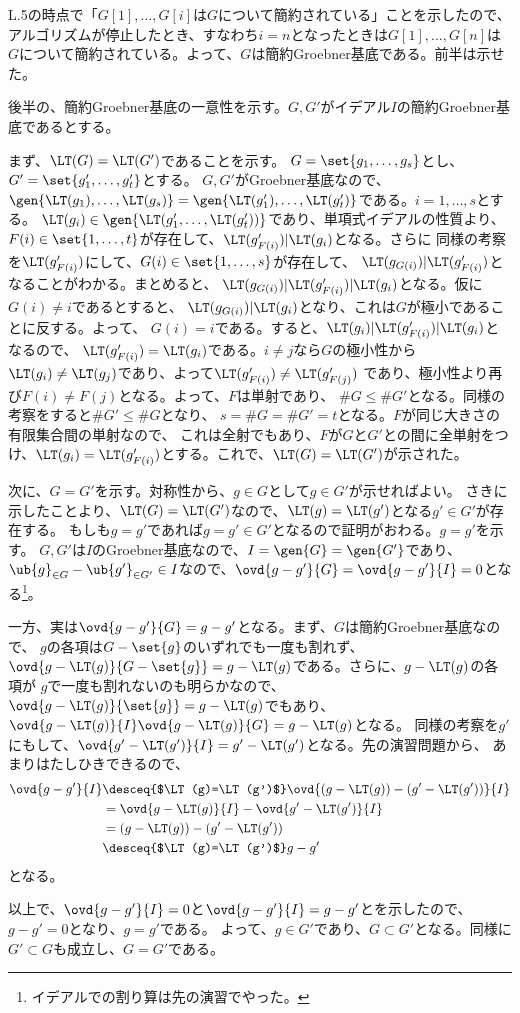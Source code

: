 \begin{myproof}
L.5の時点で「$G[1],\dots,G[i]$は$G$について簡約されている」ことを示したので、
アルゴリズムが停止したとき、すなわち$i=n$となったときは$G[1],\dots,G[n]$は$G$について簡約されている。よって、$G$は簡約Groebner基底である。前半は示せた。

後半の、簡約Groebner基底の一意性を示す。$G,G'$がイデアル$I$の簡約Groebner基底であるとする。

まず、$\LT(G) = \LT(G')$であることを示す。
$G=\set{g_1,\dots,g_s}$とし、$G'=\set{g_1',\dots,g_t'}$とする。
$G,G'$がGroebner基底なので、$\gen{\LT(g_1),\dots,\LT(g_s)} = \gen{\LT(g_1'),\dots,\LT(g_t')}$である。$i=1,\dots,s$とする。
$\LT(g_i) \in \gen{\LT(g_1',\dots,\LT(g_t'))}$であり、単項式イデアルの性質より、
$F(i) \in \set{1,\dots,t}$が存在して、$\LT(g_{F(i)}')|\LT(g_i)$となる。さらに
同様の考察を$\LT(g'_{F(i)})$にして、$G(i)\in \set{1,\dots,s}$が存在して、
$\LT(g_{G(i)})|\LT(g_{F(i)}')$となることがわかる。まとめると、
$\LT(g_{G(i)})|\LT(g_{F(i)}')|\LT(g_{i})$となる。仮に$G(i)\neq i$であるとすると、
$\LT(g_{G(i)})|\LT(g_i)$となり、これは$G$が極小であることに反する。よって、
$G(i)=i$である。すると、$\LT(g_i)|\LT(g'_{F(i)})|\LT(g_i)$となるので、
$\LT(g'_{F(i)})  = \LT(g_i)$である。$i\neq j$なら$G$の極小性から
$\LT(g_i) \neq \LT( g_j)$であり、よって$\LT(g'_{F(i)})\neq \LT(g'_{F(j)})$
であり、極小性より再び$F(i) \neq F(j)$となる。よって、$F$は単射であり、
$\# G \le \# G'$となる。同様の考察をすると$\# G' \le \# G$となり、
$s = \# G = \# G' = t$となる。$F$が同じ大きさの有限集合間の単射なので、
これは全射でもあり、$F$が$G$と$G'$との間に全単射をつけ、$\LT(g_i) = \LT(g'_{F(i)})$とする。これで、$\LT(G) = \LT(G')$が示された。

次に、$G=G'$を示す。対称性から、$g\in G$として$g\in G'$が示せればよい。
さきに示したことより、$\LT(G) = \LT(G')$なので、$\LT(g) = \LT(g')$となる$g' \in G'$が存在する。
もしも$g=g'$であれば$g  = g' \in G'$となるので証明がおわる。$g=g'$を示す。
$G,G'$は$I$のGroebner基底なので、$I=\gen{G}=\gen{G'}$であり、
$\ub{g}_{\in G}-\ub{g'}_{\in G'} \in I$なので、$\ovd{g-g'}{G} = \ovd{g-g'}{I} = 0$となる\footnote{イデアルでの割り算は先の演習でやった。}。

一方、実は$\ovd{g-g'}{G}=g-g'$となる。まず、$G$は簡約Groebner基底なので、
$g$の各項は$G-\set{g}$のいずれでも一度も割れず、
$\ovd{g-\LT(g)}{G-\set{g}} = g-\LT(g)$である。さらに、$g-\LT(g)$の各項が
$g$で一度も割れないのも明らかなので、$\ovd{g-\LT(g)}{\set{g}} = g-\LT(g)$でもあり、
$\ovd{g-\LT(g)}{I} \ovd{g-\LT(g)}{G} = g-\LT(g)$となる。
同様の考察を$g'$にもして、$\ovd{g'-\LT(g')}{I} = g'-\LT(g')$となる。先の演習問題から、
あまりはたしひきできるので、
\begin{align}
  \ovd{g-g'}{I}
  &\desceq{$\LT(g)=\LT(g')$}
  \ovd{(g-\LT(g))-(g'-\LT(g'))}{I}\\
  &=
  \ovd{g-\LT(g)}{I} - \ovd{g'-\LT(g')}{I}\\
  &=
  (g-\LT(g)) - (g'-\LT(g'))\\
  &\desceq{$\LT(g)=\LT(g')$}
  g-g'
\end{align}
となる。

以上で、$\ovd{g-g'}{I}=0$と$\ovd{g-g'}{I}=g-g'$とを示したので、$g-g'=0$となり、$g=g'$である。
よって、$g\in G'$であり、$G\subset G'$となる。同様に$G'\subset G$も成立し、$G=G'$である。
\end{myproof}

